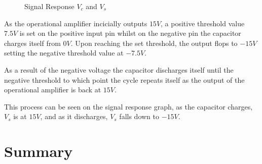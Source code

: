\documentclass[11pt, openright]{book}
\begin{document}
\begin{figure}[ht]
\begin{floatrow}
{{
                \caption{Signal Response $V_c$ and $V_s$}
            }
        }
        
    \end{floatrow}
\end{figure}

As the operational amplifier incicially outputs $15V$, a positive threshold value $7.5V$ is set on the positive input pin whilst on the negative pin the capacitor charges itself from $0V$. Upon reaching the set threshold, the output flops to $-15V$ setting the negative threshold value at $-7.5V$. 

As a result of the negative voltage the capacitor discharges itself until  the negative threshold to which point the cycle repeats itself as the output of the operational amplifier is back at $15V$.

This process can be seen on the signal response graph, as the capacitor charges, $V_s$ is at $15V$, and as it discharges, $V_s$ falls down to $-15V$.


\section{Summary}
\end{document}
